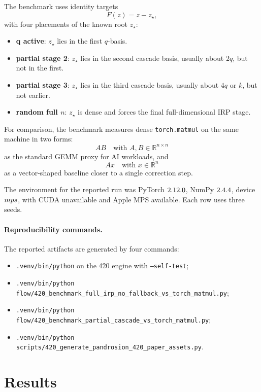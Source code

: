 \documentclass[11pt]{article}
\newcommand{\matmul}{\texttt{torch.matmul}}
\begin{document}
The benchmark uses identity targets
\[
        F(z)=z-z_\star,
\]
with four placements of the known root \(z_\star\):
\begin{itemize}[leftmargin=1.2em]
\item \textbf{q active}: \(z_\star\) lies in the first \(q\)-basis.
\item \textbf{partial stage 2}: \(z_\star\) lies in the second cascade basis,
usually about \(2q\), but not in the first.
\item \textbf{partial stage 3}: \(z_\star\) lies in the third cascade basis,
usually about \(4q\) or \(k\), but not earlier.
\item \textbf{random full \(n\)}: \(z_\star\) is dense and forces the final
full-dimensional IRP stage.
\end{itemize}

For comparison, the benchmark measures dense \matmul{} on the same machine in
two forms:
\[
        A B \quad\text{with } A,B\in\mathbb R^{n\times n}
\]
as the standard GEMM proxy for AI workloads, and
\[
        A x \quad\text{with } x\in\mathbb R^n
\]
as a vector-shaped baseline closer to a single correction step.

The environment for the reported run was PyTorch \(2.12.0\), NumPy
\(2.4.4\), device \(mps\), with CUDA unavailable and Apple MPS
available.  Each row uses three seeds.

\paragraph{Reproducibility commands.}
The reported artifacts are generated by four commands:
\begin{itemize}[leftmargin=1.4em]
\item \texttt{.venv/bin/python} on the 420 engine with \texttt{--self-test};
\item \texttt{.venv/bin/python flow/420\_benchmark\_full\_irp\_no\_fallback\_vs\_torch\_matmul.py};
\item \texttt{.venv/bin/python flow/420\_benchmark\_partial\_cascade\_vs\_torch\_matmul.py};
\item \texttt{.venv/bin/python scripts/420\_generate\_pandrosion\_420\_paper\_assets.py}.
\end{itemize}

\section{Results}
\end{document}
